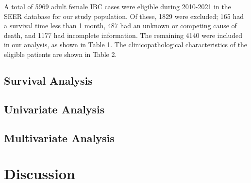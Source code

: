 \documentclass[
  letterpaper,
  DIV=11,
  numbers=noendperiod]{scrartcl}
\begin{document}
A total of 5969 adult female IBC cases were eligible during 2010-2021 in
the SEER database for our study population. Of these, 1829 were
excluded; 165 had a survival time less than 1 month, 487 had an unknown
or competing cause of death, and 1177 had incomplete information. The
remaining 4140 were included in our analysis, as shown in Table 1. The
clinicopathological characteristics of the eligible patients are shown
in Table 2.

\subsection{Survival Analysis}\label{survival-analysis}

\subsection{Univariate Analysis}\label{univariate-analysis}

\subsection{Multivariate Analysis}\label{multivariate-analysis}

\section*{Discussion}\label{discussion}
\end{document}
